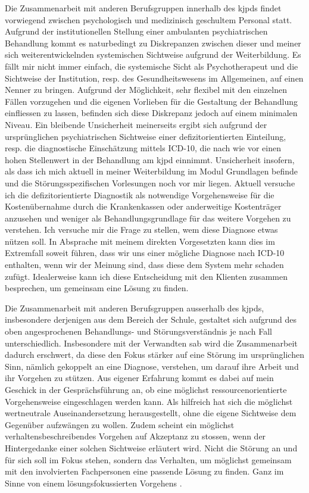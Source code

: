Die Zusammenarbeit mit anderen Berufsgruppen innerhalb des \ac{kjpd}s findet vorwiegend zwischen psychologisch und medizinisch geschultem Personal statt. Aufgrund der institutionellen Stellung einer ambulanten psychiatrischen Behandlung kommt es naturbedingt zu Diskrepanzen zwischen dieser und meiner sich weiterentwickelnden systemischen Sichtweise aufgrund der Weiterbildung. Es fällt mir nicht immer einfach, die systemische Sicht als Psychotherapeut und die Sichtweise der Institution, resp. des Gesundheitswesens im Allgemeinen, auf einen Nenner zu bringen. Aufgrund der Möglichkeit, sehr flexibel mit den einzelnen Fällen vorzugehen und die eigenen Vorlieben für die Gestaltung der Behandlung einfliessen zu lassen, befinden sich diese Diskrepanz jedoch auf einem minimalen Niveau. Ein bleibende  Unsicherheit meinerseits ergibt sich aufgrund der ursprünglichen psychiatrischen Sichtweise einer defizitorientierten Einteilung, resp. die diagnostische Einschätzung mittels  ICD-10, die nach wie vor einen hohen Stellenwert in der Behandlung am \ac{kjpd} einnimmt. Unsicherheit insofern, als dass ich mich aktuell in meiner Weiterbildung im Modul Grundlagen befinde und die Störungsspezifischen Vorlesungen noch vor mir liegen. Aktuell versuche ich die defizitorientierte Diagnostik als notwendige Vorgehensweise für die Kostenübernahme durch die Krankenkassen oder anderweitige Kostenträger anzusehen und weniger als Behandlungsgrundlage für das weitere Vorgehen zu verstehen. Ich versuche mir die Frage zu stellen, wem diese Diagnose etwas nützen soll. In Absprache mit meinem direkten Vorgesetzten kann dies im Extremfall soweit führen, dass wir uns einer mögliche Diagnose nach ICD-10 enthalten, wenn wir der Meinung sind, dass diese dem System mehr schaden zufügt. Idealerweise kann ich diese Entscheidung mit den Klienten zusammen besprechen, um gemeinsam eine Lösung zu finden. 

Die Zusammenarbeit mit anderen Berufsgruppen ausserhalb des \ac{kjpd}s, insbesondere derjenigen aus dem Bereich der Schule, gestaltet sich aufgrund des oben angesprochenen Behandlungs- und Störungsverständnis je nach Fall unterschiedlich. Insbesondere mit der Verwandten \ac{sab} wird die Zusammenarbeit dadurch erschwert, da diese den Fokus stärker auf eine Störung im ursprünglichen Sinn, nämlich gekoppelt an eine Diagnose, verstehen, um darauf ihre Arbeit und ihr Vorgehen zu stützen. Aus eigener Erfahrung kommt es dabei auf mein Geschick in der Gesprächsführung an, ob eine möglichst ressourcenorientierte Vorgehensweise eingeschlagen werden kann. Als hilfreich hat sich die möglichst wertneutrale Auseinandersetzung herausgestellt, ohne die eigene Sichtweise dem Gegenüber aufzwängen zu wollen. Zudem scheint ein möglichst verhaltensbeschreibendes Vorgehen auf Akzeptanz zu stossen, wenn der Hintergedanke einer solchen Sichtweise erläutert wird. Nicht die Störung an und für sich soll im Fokus stehen, sondern das Verhalten, um möglichst gemeinsam mit den involvierten Fachpersonen eine passende Lösung zu finden. Ganz im Sinne von einem lösungsfokussierten Vorgehens \cite{Shazer1986}. 
 
